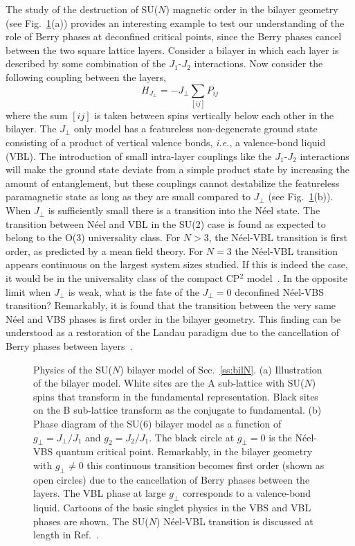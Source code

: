 \documentclass[range]{ar2e}
\begin{document}
The study of the destruction of SU($N$) magnetic order in the bilayer geometry (see Fig.~\ref{fig:pd_bil}(a)) provides an interesting example to test our
understanding of the role of Berry phases at deconfined critical points, since the Berry phases cancel between the two square lattice layers. Consider a bilayer in which each layer is described by some
combination of the $J_1$-$J_2$ interactions. Now consider the
following coupling between the layers,
\begin{equation}
 H_{J_\perp} = -J_\perp \sum_{[ij]} P_{ij}
\end{equation}
where the sum $[ij]$ is taken between spins vertically below each other
in the bilayer. The $J_\perp$ only model has a featureless non-degenerate ground state
consisting of a product of vertical valence bonds, {\em i.e.}, a valence-bond liquid (VBL). The introduction of small intra-layer couplings like the $J_1$-$J_2$ interactions will
make the ground state deviate from a simple product state by
increasing the amount of entanglement, but these couplings
 cannot destabilize the featureless paramagnetic
state as long as they are small compared to $J_\perp$ (see Fig.~\ref{fig:pd_bil}(b)). When $J_\perp$ is sufficiently small there is a transition into the N\'eel state. The transition between N\'eel and VBL in the SU(2) case is found as expected to belong to the O(3) universality class. For $N>3$, the N\'eel-VBL transition is first order, as predicted by a mean field theory. For $N=3$ the N\'eel-VBL transition appears continuous on the largest system sizes studied. If this is indeed the case, it would be in the universality class of the compact CP$^2$ model~\cite{nahum2011:loops}.  In the opposite limit when $J_\perp$ is weak, what is the fate of the $J_\perp=0$ deconfined N\'eel-VBS transition? 
Remarkably, it is found that the transition between the very same N\'eel and VBS phases is first order in the bilayer geometry. This finding can be understood as a restoration of the Landau paradigm due to the cancellation of Berry phases between layers~\cite{kaul2012:sun_bil}.



\begin{figure}
\centerline{}
  \caption{ \label{fig:pd_bil}  Physics of the SU($N$) bilayer model  of Sec.~\ref{ss:bilN}.  (a) Illustration of the bilayer model. White sites are the A sub-lattice with SU($N$) spins that transform in the fundamental representation. Black sites on the B sub-lattice transform as the conjugate to fundamental. (b) Phase diagram of the
    SU($6$) bilayer model as a function of $g_\perp =J_\perp/J_1$ and $g_2=J_2/J_1$. The black circle at $g_\perp=0$ is the N\'eel-VBS quantum critical point. Remarkably, in the bilayer geometry with $g_\perp\neq 0$ this continuous transition becomes first order (shown as open circles) due to the cancellation of Berry phases between the layers. The VBL phase at large $g_\perp$ corresponds to a valence-bond liquid. Cartoons of the basic singlet physics in the VBS and VBL phases are shown. The SU($N$) N\'eel-VBL transition is discussed at length in Ref.~\cite{kaul2012:sun_bil}.}
\end{figure}
\end{document}
